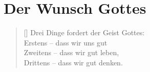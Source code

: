 \chapter{Der Wunsch Gottes}



\settowidth{\versewidth}{Drei Dinge fordert der Geist Gottes:}
\begin{verse}[\versewidth]
    Drei Dinge fordert der Geist Gottes:\\
    Erstens -- dass wir uns gut \\
    Zweitens -- dass wir gut leben, \\
    Drittens -- dass wir gut denken. 
\end{verse}



